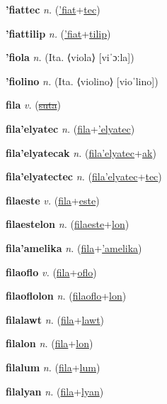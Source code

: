 \textbf{\hypertarget{'fiattec}{'fiattec}} \textit{n.} (\hyperlink{'fiat}{'fiat}+\allowbreak \hyperlink{tec}{tec})


\textbf{\hypertarget{'fiattilip}{'fiattilip}} \textit{n.} (\hyperlink{'fiat}{'fiat}+\allowbreak \hyperlink{tilip}{tilip})


\textbf{\hypertarget{'fiola}{'fiola}} \textit{n.} (Ita. ⟨viola⟩ [viˈɔːla])


\textbf{\hypertarget{'fiolino}{'fiolino}} \textit{n.} (Ita. ⟨violino⟩ [vioˈlino])


\textbf{\hypertarget{fila}{fila}} \textit{v.} (\hyperlink{suta}{\sout{suta}})


\textbf{\hypertarget{fila'elyatec}{fila'elyatec}} \textit{n.} (\hyperlink{fila}{fila}+\allowbreak \hyperlink{'elyatec}{'elyatec})


\textbf{\hypertarget{fila'elyatecak}{fila'elyatecak}} \textit{n.} (\hyperlink{fila'elyatec}{fila'elyatec}+\allowbreak \hyperlink{ak}{ak})


\textbf{\hypertarget{fila'elyatectec}{fila'elyatectec}} \textit{n.} (\hyperlink{fila'elyatec}{fila'elyatec}+\allowbreak \hyperlink{tec}{tec})


\textbf{\hypertarget{filaeste}{filaeste}} \textit{v.} (\hyperlink{fila}{fila}+\allowbreak \hyperlink{este}{este})


\textbf{\hypertarget{filaestelon}{filaestelon}} \textit{n.} (\hyperlink{filaeste}{filaeste}+\allowbreak \hyperlink{lon}{lon})


\textbf{\hypertarget{fila'amelika}{fila'amelika}} \textit{n.} (\hyperlink{fila}{fila}+\allowbreak \hyperlink{'amelika}{'amelika})


\textbf{\hypertarget{filaoflo}{filaoflo}} \textit{v.} (\hyperlink{fila}{fila}+\allowbreak \hyperlink{oflo}{oflo})


\textbf{\hypertarget{filaoflolon}{filaoflolon}} \textit{n.} (\hyperlink{filaoflo}{filaoflo}+\allowbreak \hyperlink{lon}{lon})


\textbf{\hypertarget{filalawt}{filalawt}} \textit{n.} (\hyperlink{fila}{fila}+\allowbreak \hyperlink{lawt}{lawt})


\textbf{\hypertarget{filalon}{filalon}} \textit{n.} (\hyperlink{fila}{fila}+\allowbreak \hyperlink{lon}{lon})


\textbf{\hypertarget{filalum}{filalum}} \textit{n.} (\hyperlink{fila}{fila}+\allowbreak \hyperlink{lum}{lum})


\textbf{\hypertarget{filalyan}{filalyan}} \textit{n.} (\hyperlink{fila}{fila}+\allowbreak \hyperlink{lyan}{lyan})


